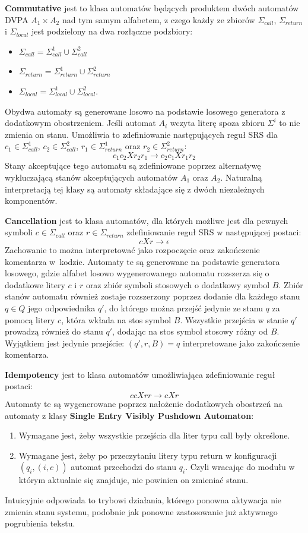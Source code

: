 \textbf{Commutative} jest to klasa automatów będących produktem dwóch automatów DVPA $A_1 \times A_2$ nad tym samym alfabetem,
z czego każdy ze zbiorów $\Sigma_{call}$, $\Sigma_{return}$ i $\Sigma_{local}$ jest podzielony na dwa rozłączne podzbiory:
\begin{itemize}
    \item $\Sigma_{call} = \Sigma_{call}^1 \cup \Sigma_{call}^2$
    \item $\Sigma_{return} = \Sigma_{return}^1 \cup \Sigma_{return}^2$
    \item $\Sigma_{local} = \Sigma_{local}^1 \cup \Sigma_{local}^2$.
\end{itemize}
Obydwa automaty są generowane losowo na podstawie losowego generatora z dodatkowym obostrzeniem.
Jeśli automat $A_i$ wczyta literę spoza zbioru $\Sigma^i$ to nie zmienia on stanu. Umożliwia to
zdefiniowanie następujących reguł SRS dla $c_1 \in \Sigma_{call}^1$, $c_2 \in \Sigma_{call}^2$,
$r_1 \in \Sigma_{return}^1$ oraz $r_2 \in \Sigma_{return}^2$:
$$c_1c_2Xr_2r_1 \rightarrow c_2c_1Xr_1r_2$$
Stany akceptujące tego automatu są zdefiniowane poprzez alternatywę wykluczającą stanów akceptujących automatów $A_1$ oraz $A_2$.
Naturalną interpretacją tej klasy są automaty składające się z dwóch niezależnych komponentów.


\textbf{Cancellation} jest to klasa automatów, dla których możliwe jest dla pewnych symboli $c \in \Sigma_{call}$
oraz $r \in \Sigma_{return}$ zdefiniowanie reguł SRS w następującej postaci:
$$cXr \rightarrow \epsilon$$
Zachowanie to można interpretować jako rozpoczęcie oraz zakończenie komentarza w~kodzie. Automaty te są generowane na podstawie generatora losowego, gdzie
alfabet losowo wygenerowanego automatu rozszerza się o dodatkowe litery $c$ i $r$ oraz zbiór symboli stosowych o dodatkowy symbol $B$. Zbiór stanów automatu również zostaje rozszerzony poprzez
dodanie dla każdego stanu $q \in Q$ jego odpowiednika $q'$, do którego można przejść jedynie ze stanu $q$ za pomocą litery $c$, która wkłada na stos symbol $B$.
Wszystkie przejścia w stanie $q'$ prowadzą również do stanu $q'$, dodając na stos symbol stosowy różny od $B$. Wyjątkiem jest jedynie przejście:
$(q', r, B) = q$ interpretowane jako zakończenie komentarza.

\textbf{Idempotency} jest to klasa automatów umożliwiająca zdefiniowanie reguł postaci:
$$ccXrr \rightarrow cXr$$
Automaty te są wygenerowane poprzez nałożenie dodatkowych obostrzeń na automaty z klasy \textbf{Single Entry Visibly Pushdown Automaton}:
\begin{enumerate}
    \item Wymagane jest, żeby wszystkie przejścia dla liter typu call były określone.
    \item Wymagane jest, żeby po przeczytaniu litery typu return w konfiguracji $(q_i, (i, c))$ automat przechodzi do stanu $q_i$.
          Czyli wracając do modułu w którym aktualnie się znajduje, nie powinien on zmieniać stanu.
\end{enumerate}
Intuicyjnie odpowiada to trybowi działania, którego ponowna aktywacja nie zmienia stanu systemu,
podobnie jak ponowne zastosowanie już aktywnego pogrubienia tekstu.